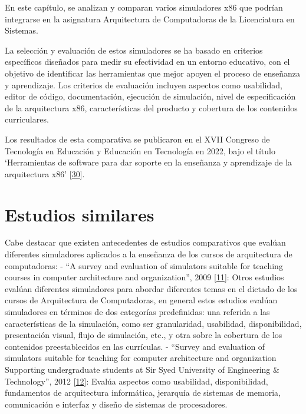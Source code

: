 \documentclass[12pt,twoside]{templates/unerthesis}
\begin{document}
En este capítulo, se analizan y comparan varios simuladores x86 que podrían integrarse en la asignatura Arquitectura de Computadoras de la Licenciatura en Sistemas.

La selección y evaluación de estos simuladores se ha basado en criterios específicos diseñados para medir su efectividad en un entorno educativo, con el objetivo de identificar las herramientas que mejor apoyen el proceso de enseñanza y aprendizaje. Los criterios de evaluación incluyen aspectos como usabilidad, editor de código, documentación, ejecución de simulación, nivel de especificación de la arquitectura x86, características del producto y cobertura de los contenidos curriculares.

Los resultados de esta comparativa se publicaron en el XVII Congreso de Tecnología en Educación y Educación en Tecnología en 2022, bajo el título `Herramientas de software para dar soporte en la enseñanza y aprendizaje de la arquitectura x86' {[}\protect\hyperlink{ref-colombani_herramientas_2022}{30}{]}.

\hypertarget{estudios-similares}{%
\section{Estudios similares}\label{estudios-similares}}

Cabe destacar que existen antecedentes de estudios comparativos que evalúan diferentes simuladores aplicados a la enseñanza de los cursos de arquitectura de computadoras:
- ``A survey and evaluation of simulators suitable for teaching courses in computer architecture and organization'', 2009 {[}\protect\hyperlink{ref-nikolic_survey_2009}{11}{]}: Otros estudios evalúan diferentes simuladores para abordar diferentes temas en el dictado de los cursos de Arquitectura de Computadoras, en general estos estudios evalúan simuladores en términos de dos categorías predefinidas: una referida a las características de la simulación, como ser granularidad, usabilidad, disponibilidad, presentación visual, flujo de simulación, etc., y otra sobre la cobertura de los contenidos preestablecidos en las currículas.
- ``Survey and evaluation of simulators suitable for teaching for computer architecture and organization Supporting undergraduate students at Sir Syed University of Engineering \& Technology'', 2012 {[}\protect\hyperlink{ref-hasan_survey_2012}{12}{]}: Evalúa aspectos como usabilidad, disponibilidad, fundamentos de arquitectura informática, jerarquía de sistemas de memoria, comunicación e interfaz y diseño de sistemas de procesadores.
\end{document}
